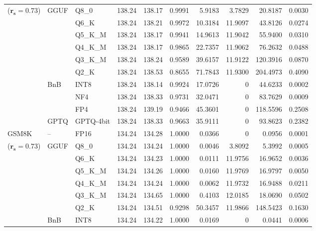 \begin{table}[t]
{\begin{tabular}{ll l rrrrrrr}
{\small ($\mathbf{r_s{=}0.73}$)} & GGUF & Q8\_0 & 138.24 & 138.17 & 0.9991 & 5.9183 & 3.7829 & 20.8187 & 0.0030 \\
 &  & Q6\_K & 138.24 & 138.21 & 0.9972 & 10.3184 & 11.9097 & 43.8126 & 0.0274 \\
 &  & Q5\_K\_M & 138.24 & 138.17 & 0.9941 & 14.9613 & 11.9042 & 55.9400 & 0.0310 \\
 &  & Q4\_K\_M & 138.24 & 138.17 & 0.9865 & 22.7357 & 11.9062 & 76.2632 & 0.0488 \\
 &  & Q3\_K\_M & 138.24 & 138.24 & 0.9589 & 39.6157 & 11.9122 & 120.3916 & 0.0870 \\
 &  & Q2\_K & 138.24 & 138.53 & \cellcolor{red!18} 0.8655 & \cellcolor{red!18} 71.7843 & 11.9300 & \cellcolor{red!18} 204.4973 & \cellcolor{red!18} 0.4090 \\
 & BnB & INT8 & 138.24 & 138.14 & 0.9924 & 17.0726 & \cellcolor{cyan!12} $0$ & 44.6233 & 0.0002 \\
 &  & NF4 & 138.24 & 138.33 & 0.9731 & 32.0471 & \cellcolor{cyan!12} $0$ & 83.7629 & 0.0009 \\
 &  & FP4 & 138.24 & 139.19 & \cellcolor{red!18} 0.9466 & \cellcolor{red!18} 45.3601 & \cellcolor{cyan!12} $0$ & \cellcolor{red!18} 118.5596 & \cellcolor{red!18} 0.2508 \\
 & GPTQ & GPTQ-4bit & 138.24 & 138.33 & 0.9663 & 35.9111 & \cellcolor{cyan!12} $0$ & 93.8623 & 0.2382 \\
\midrule
GSM8K & -- & FP16 & 134.24 & 134.28 & 1.0000 & 0.0366 & \cellcolor{cyan!12} $0$ & 0.0956 & 0.0001 \\
{\small ($\mathbf{r_s{=}0.73}$)} & GGUF & Q8\_0 & 134.24 & 134.24 & 1.0000 & 0.0046 & 3.8092 & 5.3992 & 0.0005 \\
 &  & Q6\_K & 134.24 & 134.23 & 1.0000 & 0.0111 & 11.9756 & 16.9652 & 0.0036 \\
 &  & Q5\_K\_M & 134.24 & 134.26 & 1.0000 & 0.0160 & 11.9769 & 16.9797 & 0.0050 \\
 &  & Q4\_K\_M & 134.24 & 134.24 & 1.0000 & 0.0062 & 11.9732 & 16.9488 & 0.0211 \\
 &  & Q3\_K\_M & 134.24 & 134.65 & 1.0000 & 0.4103 & 12.0185 & 18.0690 & 0.0502 \\
 &  & Q2\_K & 134.24 & 134.51 & \cellcolor{red!18} 0.9298 & \cellcolor{red!18} 50.3457 & 11.9866 & \cellcolor{red!18} 148.5423 & \cellcolor{red!18} 0.1630 \\
 & BnB & INT8 & 134.24 & 134.22 & 1.0000 & 0.0169 & \cellcolor{cyan!12} $0$ & 0.0441 & 0.0006 \\

\end{tabular}}
\end{table}

